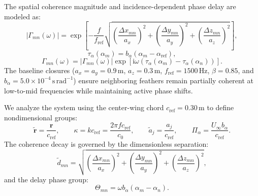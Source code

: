\documentclass[11pt]{article}
\newcommand{\ii}{\mathrm{i}}
\newcommand{\vect}[1]{\bm{#1}}
\begin{document}
The spatial coherence magnitude and incidence-dependent phase delay are modeled as:
\begin{equation}
    |\Gamma_{mn}(\omega)|
    =
    \exp\left[
        -\frac{f}{f_{\mathrm{ref}}}
        \sqrt{
            \left(\frac{\Delta x_{mn}}{a_x}\right)^2
            +
            \left(\frac{\Delta y_{mn}}{a_y}\right)^2
            +
            \left(\frac{\Delta z_{mn}}{a_z}\right)^2
        }
    \right],
\label{eq:coherence_magnitude}
\end{equation}
\begin{equation}
    \tau_\alpha(\alpha_m)
    =
    b_\alpha(\alpha_m-\alpha_{\mathrm{ref}}),
\label{eq:incidence_delay}
\end{equation}
\begin{equation}
    \Gamma_{mn}(\omega)
    =
    |\Gamma_{mn}(\omega)|
    \exp\left[
        \ii\omega
        \left(
            \tau_\alpha(\alpha_m)-\tau_\alpha(\alpha_n)
        \right)
    \right].
\label{eq:complex_coherence}
\end{equation}
The baseline closures ($a_x=a_y=0.9\,\mathrm{m}$, $a_z=0.3\,\mathrm{m}$, $f_{\mathrm{ref}}=1500\,\mathrm{Hz}$, $\beta=0.85$, and $b_\alpha=5.0\times 10^{-4}\,\mathrm{s\,rad^{-1}}$) ensure neighboring feathers remain partially coherent at low-to-mid frequencies while maintaining active phase shifts.

We analyze the system using the center-wing chord $c_{\mathrm{ref}} = 0.30\,\mathrm{m}$ to define nondimensional groups:
\begin{equation}
    \tilde{\vect{r}}=\frac{\vect{r}}{c_{\mathrm{ref}}},
    \qquad
    \kappa = kc_{\mathrm{ref}} = \frac{2\pi f c_{\mathrm{ref}}}{c_0},
    \qquad
    \tilde{a}_j = \frac{a_j}{c_{\mathrm{ref}}},
    \qquad
    \Pi_\alpha = \frac{U_\infty b_\alpha}{c_{\mathrm{ref}}}.
\label{eq:nondim_groups}
\end{equation}
The coherence decay is governed by the dimensionless separation:
\begin{equation}
    \tilde{d}_{mn}
    =
    \sqrt{
        \left(\frac{\Delta x_{mn}}{a_x}\right)^2
        +
        \left(\frac{\Delta y_{mn}}{a_y}\right)^2
        +
        \left(\frac{\Delta z_{mn}}{a_z}\right)^2
    },
\label{eq:nondim_coherence_distance}
\end{equation}
and the delay phase group:
\begin{equation}
    \Theta_{mn}
    =
    \omega b_\alpha(\alpha_m-\alpha_n).
\label{eq:delay_phase_group}
\end{equation}
\end{document}
